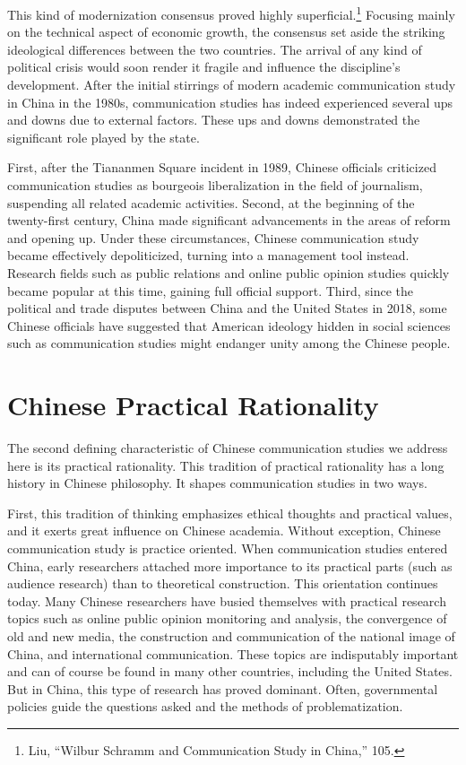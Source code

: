 \documentclass{tufte-handout}
\begin{document}
This kind of modernization consensus proved highly
superficial.\footnote{Liu, ``Wilbur Schramm and Communication Study in
  China,'' 105.} Focusing mainly on the technical aspect of economic
growth, the consensus set aside the striking ideological differences
between the two countries. The arrival of any kind of political crisis
would soon render it fragile and influence the discipline's development.
After the initial stirrings of modern academic communication study in
China in the 1980s, communication studies has indeed experienced several
ups and downs due to external factors. These ups and downs demonstrated
the significant role played by the state.

First, after the Tiananmen Square incident in 1989, Chinese officials
criticized communication studies as bourgeois liberalization in the
field of journalism, suspending all related academic activities. Second,
at the beginning of the twenty-first century, China made significant
advancements in the areas of reform and opening up. Under these
circumstances, Chinese communication study became effectively
depoliticized, turning into a management tool instead. Research fields
such as public relations and online public opinion studies quickly
became popular at this time, gaining full official support. Third, since
the political and trade disputes between China and the United States in
2018, some Chinese officials have suggested that American ideology
hidden in social sciences such as communication studies might endanger
unity among the Chinese people.

\hypertarget{chinese-practical-rationality}{%
\section{Chinese Practical
Rationality}\label{chinese-practical-rationality}}

The second defining characteristic of Chinese communication studies we
address here is its practical rationality. This tradition of practical
rationality has a long history in Chinese philosophy. It shapes
communication studies in two ways.

First, this tradition of thinking emphasizes ethical thoughts and
practical values, and it exerts great influence on Chinese academia.
Without exception, Chinese communication study is practice oriented.
When communication studies entered China, early researchers attached
more importance to its practical parts (such as audience research) than
to theoretical construction. This orientation continues today. Many
Chinese researchers have busied themselves with practical research
topics such as online public opinion monitoring and analysis, the
convergence of old and new media, the construction and communication of
the national image of China, and international communication. These
topics are indisputably important and can of course be found in many
other countries, including the United States. But in China, this type of
research has proved dominant. Often, governmental policies guide the
questions asked and the methods of problematization.
\end{document}
